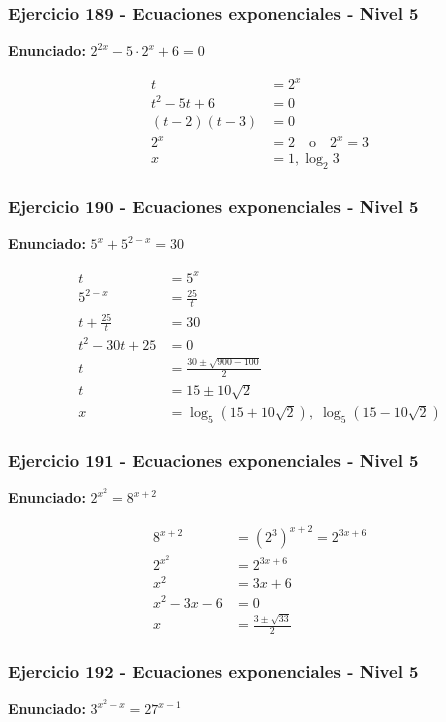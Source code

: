\documentclass[12pt,a4paper]{article}
\begin{document}
\subsubsection*{Ejercicio 189 - Ecuaciones exponenciales - Nivel 5}
\textbf{Enunciado:} \(2^{2x}-5\cdot 2^x+6=0\)

\[
\begin{aligned}
t&=2^x\\
t^2-5t+6&=0\\
(t-2)(t-3)&=0\\
2^x&=2\quad \text{o}\quad 2^x=3\\
x&=\boxed{1,\log_2 3}
\end{aligned}
\]


\subsubsection*{Ejercicio 190 - Ecuaciones exponenciales - Nivel 5}
\textbf{Enunciado:} \(5^x+5^{2-x}=30\)

\[
\begin{aligned}
t&=5^x\\
5^{2-x}&=\frac{25}{t}\\
t+\frac{25}{t}&=30\\
t^2-30t+25&=0\\
t&=\frac{30\pm\sqrt{900-100}}2\\
t&=15\pm10\sqrt2\\
x&=\boxed{\log_5(15+10\sqrt2),\;\log_5(15-10\sqrt2)}
\end{aligned}
\]


\subsubsection*{Ejercicio 191 - Ecuaciones exponenciales - Nivel 5}
\textbf{Enunciado:} \(2^{x^2}=8^{x+2}\)

\[
\begin{aligned}
8^{x+2}&=(2^3)^{x+2}=2^{3x+6}\\
2^{x^2}&=2^{3x+6}\\
x^2&=3x+6\\
x^2-3x-6&=0\\
x&=\boxed{\frac{3\pm\sqrt{33}}2}
\end{aligned}
\]


\subsubsection*{Ejercicio 192 - Ecuaciones exponenciales - Nivel 5}
\textbf{Enunciado:} \(3^{x^2-x}=27^{x-1}\)
\end{document}
